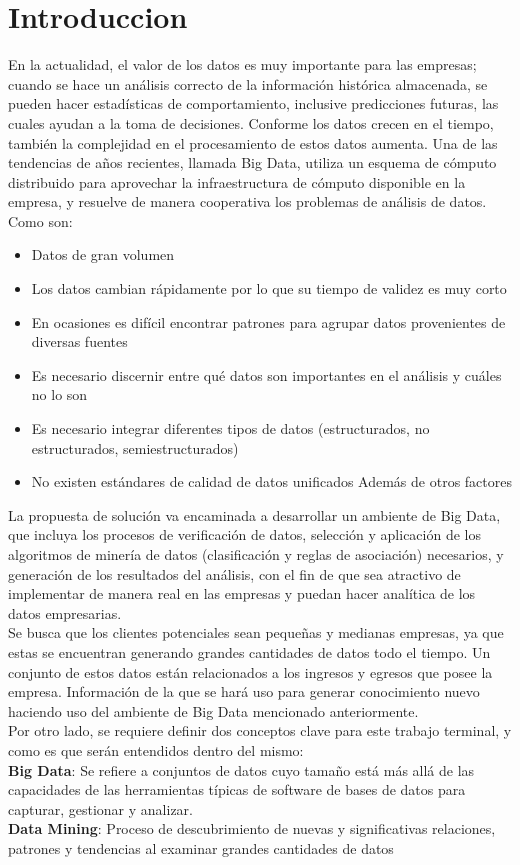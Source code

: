 \hypertarget{seccion:IniciarSesion}{\vspace{1pt}}
\section{Introduccion}
En la actualidad, el valor de los datos es muy importante para las empresas; cuando se hace un análisis correcto de la información
histórica almacenada, se pueden hacer estadísticas de comportamiento, inclusive predicciones futuras, las cuales ayudan a la toma
de decisiones. Conforme los datos crecen en el tiempo, también la complejidad en el procesamiento de estos datos aumenta.
Una de las tendencias de años recientes, llamada Big Data, utiliza un esquema de cómputo distribuido para aprovechar la
infraestructura de cómputo disponible en la empresa, y resuelve de manera cooperativa los problemas de análisis de datos.
\\
Como son:
\begin{itemize}
\item Datos de gran volumen 
\item Los datos cambian rápidamente por lo que su tiempo de validez es muy corto
\item En ocasiones es difícil encontrar patrones para agrupar datos provenientes de diversas fuentes 
\item Es necesario discernir entre qué datos son importantes en el análisis y cuáles no lo son 
\item Es necesario integrar diferentes tipos de datos (estructurados, no estructurados, semiestructurados) 
\item No existen estándares de calidad de datos unificados
Además de otros factores 
\end{itemize}
La propuesta de solución va encaminada a desarrollar un ambiente de Big Data, que incluya los procesos de verificación de datos,
selección y aplicación de los algoritmos de minería de datos (clasificación y reglas de asociación) necesarios, y generación de los
resultados del análisis, con el fin de que sea atractivo de implementar de manera real en las empresas y puedan hacer analítica de
los datos empresarias.
\\
Se busca que los clientes potenciales sean pequeñas y medianas empresas, ya que estas se encuentran generando grandes
cantidades de datos todo el tiempo. Un conjunto de estos datos están relacionados a los ingresos y egresos que posee la empresa.
Información de la que se hará uso para generar conocimiento nuevo haciendo uso del ambiente de Big Data mencionado
anteriormente.
\\
Por otro lado, se requiere definir dos conceptos clave para este trabajo terminal, y como es que serán entendidos dentro del mismo:
\\
\textbf{Big Data}: Se refiere a conjuntos de datos cuyo tamaño está más allá de las capacidades de las herramientas típicas de software de
bases de datos para capturar, gestionar y analizar.
\\
\textbf{Data Mining}: Proceso de descubrimiento de nuevas y significativas relaciones, patrones y tendencias al examinar grandes
cantidades de datos
